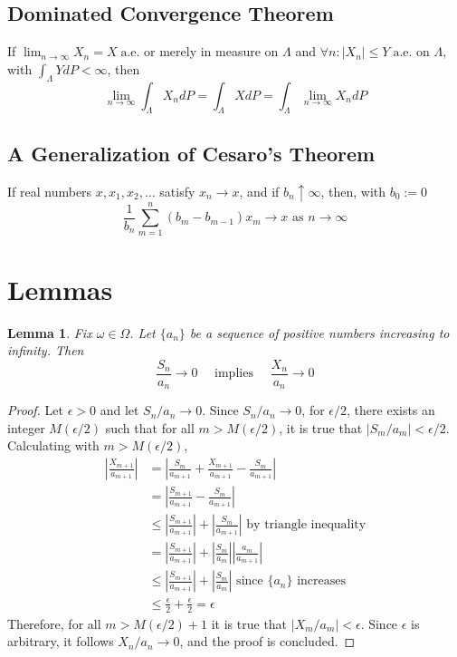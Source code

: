 \documentclass[letterpaper, 12pt]{article}
\newtheorem{lem}{Lemma}
\renewcommand{\ae}{\;\text{a.e.}}
\begin{document}
\subsection*{Dominated Convergence Theorem}
If $\lim_{n \to \infty} X_n = X \ae$ or merely in measure on $\Lambda$ and $\forall n: |X_n| \leq Y \ae$ on $\Lambda$, with 
$\int_\Lambda Y dP < \infty$, then
\[
\lim_{n \to \infty} \int_\Lambda X_n dP 
= 
\int_\Lambda X dP 
=
\int_\Lambda \lim_{n \to \infty} X_n dP
\]  

\subsection*{A Generalization of Cesaro's Theorem}
If real numbers $x, x_1, x_2, \dots$ satisfy $x_n \to x$, and if $b_n \uparrow \infty$, then, with $b_0 := 0$
\[
\frac{1}{b_n} \sum_{m=1}^n (b_m - b_{m-1})x_m \to x
\text{ as }
n \to \infty
\]

\section*{Lemmas}
\begin{lem}
Fix $\omega \in \Omega$.
Let $\{a_n\}$ be a sequence of positive numbers increasing to infinity. Then
\[
\frac{S_n}{a_n} \to 0 \quad\text{ implies }\quad \frac{X_n}{a_n} \to 0
\]
\end{lem}
\begin{proof}
Let $\epsilon > 0$ and let $S_n/a_n \to 0$. Since $S_n/a_n \to 0$, for $\epsilon/2$, there exists an integer $M(\epsilon/2)$ such that for all $m > M(\epsilon/2)$, it is true that $|S_m/a_m| < \epsilon/2$. Calculating with $m > M(\epsilon/2)$,
\begin{align*}
\left\lvert
\frac{X_{m+1}}{a_{m+1}}
\right\rvert
&=
\left\lvert
\frac{S_{m}}{a_{m+1}}
+
\frac{X_{m+1}}{a_{m+1}}
-
\frac{S_{m}}{a_{m+1}}
\right\rvert
\\
&=
\left\lvert
\frac{S_{m+1}}{a_{m+1}}
-
\frac{S_{m}}{a_{m+1}}
\right\rvert
\\
&\leq
\left\lvert
\frac{S_{m+1}}{a_{m+1}}
\right\rvert
+
\left\lvert
\frac{S_{m}}{a_{m+1}}
\right\rvert
\text{ by triangle inequality}
\\
&=
\left\lvert
\frac{S_{m+1}}{a_{m+1}}
\right\rvert
+
\left\lvert
\frac{S_{m}}{a_{m}}
\right\rvert
\left\lvert
\frac{a_{m}}{a_{m+1}}
\right\rvert
\\
&\leq
\left\lvert
\frac{S_{m+1}}{a_{m+1}}
\right\rvert
+
\left\lvert
\frac{S_{m}}{a_{m}}
\right\rvert
\text{ since $\{a_n\}$ increases}
\\
&\leq
\frac{\epsilon}{2}
+ 
\frac{\epsilon}{2}
=
\epsilon
\end{align*}
Therefore, for all $m > M(\epsilon/2) + 1$ it is true that $|X_m/a_m| < \epsilon$. Since $\epsilon$ is arbitrary, it follows $X_n/a_n \to 0$, and the proof is concluded.
\end{proof}
\end{document}
